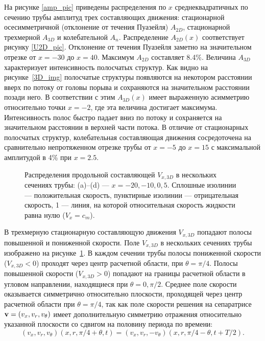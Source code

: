 На рисунке \ref{amp_pic} приведены распределения по $x$ среднеквадратичных по сечению трубы амплитуд трех составляющих движения: стационарной осесимметричной (отклонение от течения Пуазейля) $A_{2D}$, стационарной трехмерной $A_{3D}$ и колебательной $A_n$. Распределение $A_{2D}(x)$ соответствует рисунку \ref{U2D_pic}. Отклонение от течения Пуазейля заметно на значительном отрезке от $x=-30$ до $x=40$. Максимум $A_{2D}$ составляет 8.4\%. Величина $A_{3D}$ характеризует интенсивность полосчатых структур. Как видно на рисунке~\ref{3D_img} полосчатые структуры появляются на некотором расстоянии вверх по потоку от головы порыва и сохраняются на значительном расстоянии позади него. В соответствии с этим $A_{3D}(x)$ имеет выраженную асимметрию относительно точки $x=-2$, где эта величина достигает максимума. Интенсивность полос быстро падает вниз по потоку и сохраняется на значительном расстоянии в верхней части потока. В отличие от стационарных полосчатых структур, колебательная составляющая движения сосредоточена на сравнительно непротяженном отрезке трубы от $x=-5$ до $x=15$ с максимальной амплитудой в 4\% при $x=2.5$.


\begin{figure}[h]
\caption{Распределения продольной составляющей $V_{x,3D}$ в нескольких сечениях трубы: (a)--(d) --- $x = -20, -10, 0, 5$. Сплошные изолинии --- положительная скорость, пунктирные изолинии --- отрицательная скорость, 1 --- линия, на которой относительная скорость жидкости равна нулю ($V_{x} = c_m$).}
\label{V3D_cs_pic}
\end{figure}


В трехмерную стационарную составляющую движения $V_{x,3D}$ попадают полосы повышенной и пониженной скорости. Поле $V_{x,3D}$ в нескольких сечениях трубы изображено на рисунке~\ref{V3D_cs_pic}. В каждом сечении трубы полосы пониженной скорости ($V_{x,3D} < 0$) проходят через центр расчетной области, при $\theta = \pi/4$. Полосы повышенной скорости ($V_{x,3D} > 0$) попадают на границы расчетной области в угловом направлении, находящиеся при $\theta = 0, \pi/2$. Среднее поле скорости оказывается симметрично относительно плоскости, проходящей через центр расчетной области при $\theta = \pi/4$, так как поле скорости решения на сепаратрисе $\mathbf{v} = (v_x, v_r, v_\theta)$ имеет дополнительную симметрию отражения относительно указанной плоскости со сдвигом на половину периода по времени:
\begin{equation}
(v_x, v_r, v_\theta)(x, r, \pi/4 + \theta, t) = (v_x, v_r, -v_\theta)(x, r, \pi/4 - \theta, t + T/2). 
\end{equation} 


